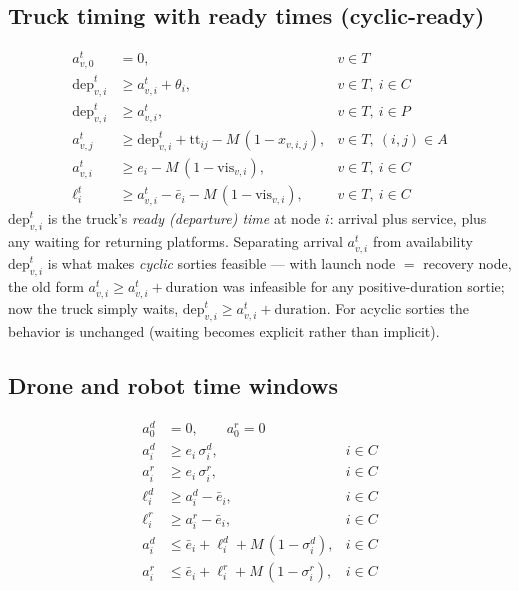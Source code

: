 \documentclass[10pt]{article}
\begin{document}
\subsection{Truck timing with ready times (cyclic-ready)}
\label{sec:truck-time}
\begin{align}
a^t_{v,0} &= 0, & v\in T \label{eq:truck-start-time}\\
\mathrm{dep}^t_{v,i} &\ge a^t_{v,i} + \theta_i, & v\in T,\ i\in C \label{eq:truck-ready-cust}\\
\mathrm{dep}^t_{v,i} &\ge a^t_{v,i}, & v\in T,\ i\in P \label{eq:truck-ready-depot}\\
a^t_{v,j} &\ge \mathrm{dep}^t_{v,i} + \mathrm{tt}_{ij} - M\,(1-x_{v,i,j}), & v\in T,\ (i,j)\in A \label{eq:truck-time-propagation}\\
a^t_{v,i} &\ge e_i - M\,(1-\mathrm{vis}_{v,i}), & v\in T,\ i\in C \label{eq:truck-open}\\
\ell^t_i &\ge a^t_{v,i} - \bar{e}_i - M\,(1-\mathrm{vis}_{v,i}), & v\in T,\ i\in C \label{eq:truck-late}
\end{align}
\noindent $\mathrm{dep}^t_{v,i}$ is the truck's \emph{ready (departure) time} at
node $i$: arrival plus service, plus any waiting for returning platforms.
Separating arrival $a^t_{v,i}$ from availability $\mathrm{dep}^t_{v,i}$ is what
makes \emph{cyclic} sorties feasible --- with launch node $=$ recovery node,
the old form $a^t_{v,i} \ge a^t_{v,i} + \text{duration}$ was infeasible for any
positive-duration sortie; now the truck simply waits,
$\mathrm{dep}^t_{v,i} \ge a^t_{v,i} + \text{duration}$. For acyclic sorties the
behavior is unchanged (waiting becomes explicit rather than implicit).

\subsection{Drone and robot time windows}
\label{sec:drone-robot-tw}
\begin{align}
a^d_0 &= 0, \qquad a^r_0 = 0 \label{eq:start-time-platforms}\\
a^d_i &\ge e_i\, \sigma^d_i, & i\in C \label{eq:open-drone}\\
a^r_i &\ge e_i\, \sigma^r_i, & i\in C \label{eq:open-robot}\\
\ell^d_i &\ge a^d_i - \bar{e}_i, & i\in C \label{eq:late-drone-def}\\
\ell^r_i &\ge a^r_i - \bar{e}_i, & i\in C \label{eq:late-robot-def}\\
a^d_i &\le \bar{e}_i + \ell^d_i + M\,(1-\sigma^d_i), & i\in C \label{eq:tw-drone}\\
a^r_i &\le \bar{e}_i + \ell^r_i + M\,(1-\sigma^r_i), & i\in C \label{eq:tw-robot}
\end{align}
\end{document}
